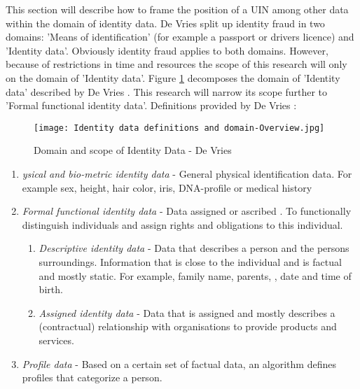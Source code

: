 This section will describe how to frame the position of a UIN among other data within the domain of identity data.
De Vries \etal \cite{Vries2007IdentiteitsfraudeEA} split up identity fraud in two domains: 'Means of identification' (for example a passport or drivers licence) and 'Identity data'. Obviously identity fraud applies to both domains. However, because of restrictions in time and resources the scope of this research will only on the domain of 'Identity data'.
Figure \ref{fig:ID_domain} decomposes the domain of 'Identity data' described by De Vries \etal. This research will narrow its scope further to 'Formal functional identity data'.  Definitions provided by De Vries \etal: 

    \begin{figure}
        \graphicspath{ {./images/} }
        \texttt{[image: Identity data definitions and domain-Overview.jpg]}\\
        \caption{Domain and scope of Identity Data - De Vries \etal \cite{Vries2007IdentiteitsfraudeEA}}
        \label{fig:ID_domain}
    \end{figure}

\begin{enumerate}
\item \textit{ysical and bio-metric identity data} - General physical identification data. For example sex, height, hair color, iris, DNA-profile or medical history
\item \textit{Formal functional identity data} - Data assigned or ascribed . To functionally distinguish individuals and assign rights and obligations to this individual.
\begin{enumerate}
\item \textit{Descriptive identity data} - Data that describes a person and the persons surroundings. Information that is close to the individual and is factual and mostly static. For example, family name, parents, , date and time of birth. 
\item \textit{Assigned identity data} - Data that is assigned and mostly describes a (contractual) relationship with organisations to provide products and services.
\end{enumerate}
\item \textit{Profile data} - Based on a certain set of factual data, an algorithm defines profiles that categorize a person. 
\end{enumerate}

